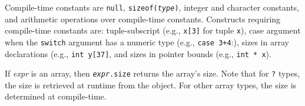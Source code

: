
Compile-time constants are \texttt{null},
\texttt{sizeof(\textit{type})}, integer and character constants, and
arithmetic operations over compile-time constants.  Constructs
requiring compile-time constants are: tuple-subscript (e.g.,
\texttt{x[3]} for tuple \texttt{x}), case argument when the
\texttt{switch} argument has a numeric type (e.g., \texttt{case
  3+4}:), sizes in array declarations (e.g., \texttt{int y[37]}, and
sizes in pointer bounds (e.g., \texttt{int * x\rb}).


If \textit{expr} is an array, then \texttt{{\it expr}.size} returns
the array's size.  Note that for \texttt{?} types, the size is
retrieved at runtime from the object.  For other array types,
the size is determined at compile-time.

  
